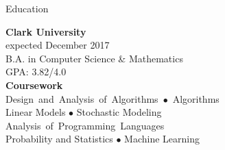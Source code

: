 \documentclass{resume} %
\newcommand{\mybullet}[0]{\textcolor{mygray}{$\bullet$} }
\begin{document}

\begin{rSection}{Education}

\color{jobcolor}
\begin{vwcol}[widths={0.45, 0.55}, indent=0pt, rule=0pt]
\textcolor{jobcolor}{\textbf{Clark University}}\\
\textcolor{mygray}{expected December 2017} \\
B.A. in Computer Science \& Mathematics \\
GPA: 3.82/4.0
\vspace{5 mm}
\\


\textcolor{jobcolor}{\textbf{Coursework}} \\ \mbox{Design and Analysis of Algorithms \mybullet Algorithms}\\
Linear Models \mybullet Stochastic Modeling \\
\mbox{Analysis of Programming Languages}\\ Probability and Statistics \mybullet Machine Learning


\end{vwcol}

\end{rSection}

\end{document}
